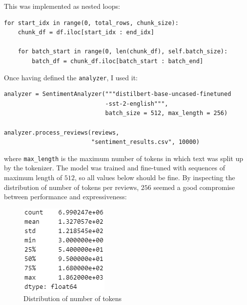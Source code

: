 \documentclass{Configuration_Files/PoliMi3i_thesis}
\begin{document}
This was implemented as nested loops:
\begin{verbatim}
for start_idx in range(0, total_rows, chunk_size):
    chunk_df = df.iloc[start_idx : end_idx]
    
    for batch_start in range(0, len(chunk_df), self.batch_size):
        batch_df = chunk_df.iloc[batch_start : batch_end]
\end{verbatim}

Once having defined the \texttt{analyzer}, I used it:

\begin{verbatim}
analyzer = SentimentAnalyzer("""distilbert-base-uncased-finetuned
                             -sst-2-english""", 
                             batch_size = 512, max_length = 256)

analyzer.process_reviews(reviews, 
                         "sentiment_results.csv", 10000)
\end{verbatim}

where \texttt{max\_length} is the maximum number of tokens in which text was split up by the tokenizer. The model was trained and fine-tuned with sequences of maximum length of $512$, so all values below should be fine. By inspecting the distribution of number of tokens per reviews, $256$ seemed a good compromise between performance and expressiveness:

\bigskip

\begin{figure}[H]
    \centering
    \includegraphics[width=1\columnwidth / 4]{imgs/num_tokens.png}
    \caption{Distribution of number of tokens}
    \label{fig:token_distr}
\end{figure}
\end{document}
